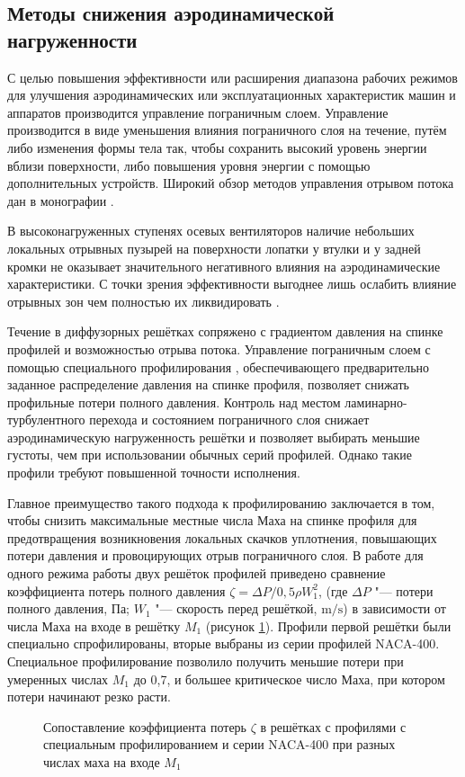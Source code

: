 \subsection{Методы снижения аэродинамической нагруженности}\label{ch1/sec7}

С целью повышения эффективности или расширения диапазона рабочих режимов для улучшения аэродинамических или эксплуатационных характеристик машин и аппаратов производится управление пограничным слоем. Управление производится в виде уменьшения влияния пограничного слоя на течение, путём либо изменения формы тела так, чтобы сохранить высокий уровень энергии вблизи поверхности, либо повышения уровня энергии с помощью дополнительных устройств. Широкий обзор методов управления отрывом потока дан в монографии  \cite{Chen1979}.

В высоконагруженных ступенях осевых вентиляторов наличие небольших локальных отрывных пузырей на поверхности лопатки у втулки и у задней кромки не оказывает значительного негативного влияния на аэродинамические характеристики. С точки зрения эффективности выгоднее лишь ослабить влияние отрывных зон чем полностью их ликвидировать \cite{Chen1979}.

Течение в диффузорных решётках сопряжено с градиентом давления на спинке профилей и возможностью отрыва потока. Управление пограничным слоем с помощью специального профилирования \cite{Papailiou1970,Hobbs1984,Meng2023}, обеспечивающего предварительно заданное распределение давления на спинке профиля, позволяет снижать профильные потери полного давления. Контроль над местом ламинарно-турбулентного перехода и состоянием пограничного слоя снижает аэродинамическую нагруженность решётки и позволяет выбирать меньшие густоты, чем при использовании обычных серий профилей. Однако такие профили требуют повышенной точности исполнения.

Главное преимущество такого подхода к профилированию заключается в том, чтобы снизить максимальные местные числа Маха на спинке профиля для предотвращения возникновения локальных скачков уплотнения, повышающих потери давления и провоцирующих отрыв пограничного слоя. В работе \cite{Hobbs1984} для одного режима работы двух решёток профилей приведено сравнение коэффициента потерь полного давления \(\zeta = \Delta P /0,5 \rho W_1^2\), (где \(\Delta P\) "--- потери полного давления, Па; \(W_1\) "--- скорость перед решёткой, \(\si\meter/\si\second\)) в зависимости от числа Маха на входе в решётку \(M_1\) (рисунок \ref{fig:Hobbs1984}). Профили первой решётки были специально спрофилированы, вторые выбраны из серии профилей NACA-400. Специальное профилирование позволило получить меньшие потери при умеренных числах \(M_1\) до 0,7, и большее критическое число Маха, при котором потери начинают резко расти. 
\begin{figure} [ht]
	\centerfloat{
		
	}
	\caption{Сопоставление коэффициента потерь \(\zeta\) в решётках с профилями с специальным профилированием и серии NACA-400 при разных числах маха на входе \(M_1\) \cite{Hobbs1984}}
	\label{fig:Hobbs1984}
\end{figure}

